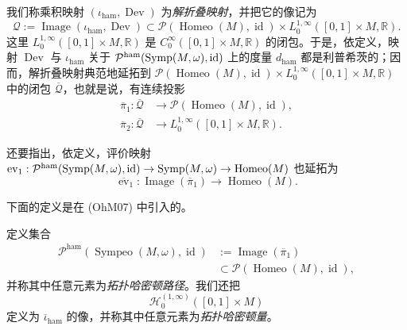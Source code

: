 我们称乘积映射 $(\iota_{\mathrm{ham}},\operatorname{Dev})$ 为\emph{解折叠映射}，并把它的像记为
\begin{equation}
 \mathcal Q:=\operatorname{Image}(\iota_{\mathrm{ham}},\operatorname{Dev})
 \subset\mathcal P(\operatorname{Homeo}(M),\operatorname{id})
 \times L_0^{1,\infty}([0,1]\times M,\mathbb R).
 \label{eq:unfolding-map-image}
\end{equation}
这里 $L_0^{1,\infty}([0,1]\times M,\mathbb R)$ 是
$C_0^\infty([0,1]\times M,\mathbb R)$ 的闭包。于是，依定义，映射
$\operatorname{Dev}$ 与 $\iota_{\mathrm{ham}}$ 关于
$\mathcal P^{\mathrm{ham}}(\operatorname{Symp}(M,\omega),\operatorname{id})$ 上的度量
$d_{\mathrm{ham}}$ 都是利普希茨的；因而，解折叠映射典范地延拓到
$\mathcal P(\operatorname{Homeo}(M),\operatorname{id})\times
L_0^{1,\infty}([0,1]\times M,\mathbb R)$ 中的闭包
$\overline{\mathcal Q}$，也就是说，有连续投影
\begin{align}
 \overline\pi_1:\overline{\mathcal Q}
 &\longrightarrow\mathcal P(\operatorname{Homeo}(M),\operatorname{id}),
 \label{eq:projection-topological-hamiltonian-paths}\\
 \overline\pi_2:\overline{\mathcal Q}
 &\longrightarrow L_0^{1,\infty}([0,1]\times M,\mathbb R).
 \label{eq:projection-topological-hamiltonians}
\end{align}

还要指出，依定义，评价映射
$\operatorname{ev}_1:\mathcal P^{\mathrm{ham}}
(\operatorname{Symp}(M,\omega),\operatorname{id})\to\operatorname{Symp}(M,\omega)
\to\operatorname{Homeo}(M)$ 也延拓为
\begin{equation}
 \overline{\operatorname{ev}}_1:
 \operatorname{Image}(\overline\pi_1)\longrightarrow
 \operatorname{Homeo}(M).
 \label{eq:extended-time-one-evaluation}
\end{equation}

下面的定义是在 (OhM07) 中引入的。

\begin{definition}\label{def:topological-hamiltonian-path}
定义集合
\[
\begin{split}
 \mathcal P^{\mathrm{ham}}
 (\operatorname{Sympeo}(M,\omega),\operatorname{id})
 &:={\operatorname{Image}}(\overline\pi_1)\\
 &\subset\mathcal P(\operatorname{Homeo}(M),\operatorname{id}),
\end{split}
\]
并称其中任意元素为\emph{拓扑哈密顿路径}。我们还把
\[
 \mathcal H_0^{(1,\infty)}([0,1]\times M)
\]
定义为 $\overline\iota_{\mathrm{ham}}$ 的像，并称其中任意元素为\emph{拓扑哈密顿量}。
\end{definition}

